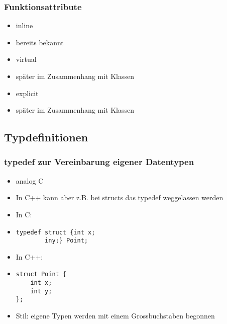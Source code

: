 \subsubsection{Funktionsattribute\hfill}
\label{sec:unterunterabschnitt}
\begin{itemize}
	\item inline
	\item[\-] bereits bekannt
	\item virtual
	\item[\-] später im Zusammenhang mit Klassen
	\item explicit
	\item[\-] später im Zusammenhang mit Klassen
\end{itemize}


\subsection{Typdefinitionen\hfill}
\label{sec:unterabschnitt}

\subsubsection{typedef zur Vereinbarung eigener Datentypen\hfill}
\label{sec:uterunterabschnitt}
\begin{itemize}
	\item analog C
	\item In C++ kann aber z.B. bei structs das typedef weggelassen werden
	\item In C:
	\item[\-]
\noindent
\begin{minipage}{\linewidth}
\begin{lstlisting}
typedef struct {int x;
		iny;} Point;
\end{lstlisting}
\end{minipage}
	\item In C++:
	\item[\-]
\noindent
\begin{minipage}{\linewidth}
\begin{lstlisting}
struct Point {
	int x;
	int y;
};
\end{lstlisting}
\end{minipage}
	\item Stil: eigene Typen werden mit einem Grossbuchstaben begonnen
\end{itemize}

